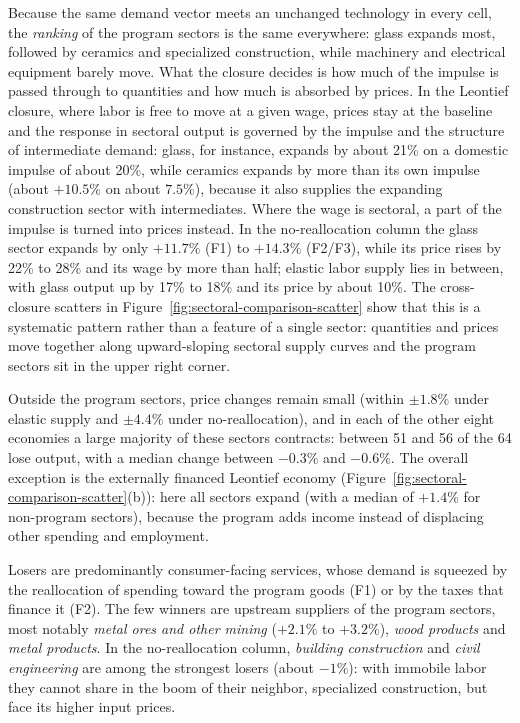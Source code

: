 Because the same demand vector meets an unchanged technology in every cell, the \emph{ranking} of the program sectors is the same everywhere: glass expands most, followed by ceramics and specialized construction, while machinery and electrical equipment barely move. What the closure decides is how much of the impulse is passed through to quantities and how much is absorbed by prices. In the Leontief closure, where labor is free to move at a given wage, prices stay at the baseline and the response in sectoral output is governed by the impulse and the structure of intermediate demand: glass, for instance, expands by about 21\% on a domestic impulse of about 20\%, while ceramics expands by more than its own impulse (about $+10.5\%$ on about $7.5\%$), because it also supplies the expanding construction sector with intermediates. Where the wage is sectoral, a part of the impulse is turned into prices instead. In the no-reallocation column the glass sector expands by only $+11.7\%$ (F1) to $+14.3\%$ (F2/F3), while its price rises by 22\% to 28\% and its wage by more than half; elastic labor supply lies in between, with glass output up by 17\% to 18\% and its price by about 10\%. The cross-closure scatters in Figure~\ref{fig:sectoral-comparison-scatter} show that this is a systematic pattern rather than a feature of a single sector: quantities and prices move together along upward-sloping sectoral supply curves and the program sectors sit in the upper right corner.

Outside the program sectors, price changes remain small (within $\pm 1.8\%$ under elastic supply and $\pm 4.4\%$ under no-reallocation), and in each of the other eight economies a large majority of these sectors contracts: between 51 and 56 of the 64 lose output, with a median change between $-0.3\%$ and $-0.6\%$. The overall exception is the externally financed Leontief economy (Figure~\ref{fig:sectoral-comparison-scatter}(b)): here all sectors expand (with a median of $+1.4\%$ for non-program sectors), because the program adds income instead of displacing other spending and employment.

Losers are predominantly consumer-facing services, whose demand is squeezed by the reallocation of spending toward the program goods (F1) or by the taxes that finance it (F2). The few winners are upstream suppliers of the program sectors, most notably \emph{metal ores and other mining} ($+2.1\%$ to $+3.2\%$), \emph{wood products} and \emph{metal products}. In the no-reallocation column, \emph{building construction} and \emph{civil engineering} are among the strongest losers (about $-1\%$): with immobile labor they cannot share in the boom of their neighbor, specialized construction, but face its higher input prices. 


